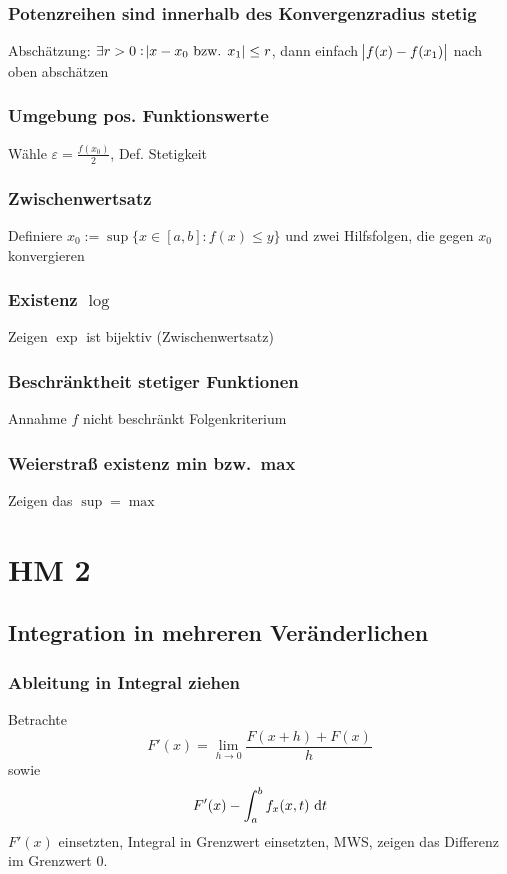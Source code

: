 \subsection{Potenzreihen sind innerhalb des Konvergenzradius stetig }
 Abschätzung: $\exists r>0 : \abs{x-x_0 \text{ bzw. }
 x_1} \leq r$, dann einfach $\abs{f(x)-f(x_1)}$ nach oben abschätzen
\subsection{Umgebung pos. Funktionswerte }
 Wähle $\varepsilon = \frac{f(x_0)}{2}$, Def. Stetigkeit
\subsection{Zwischenwertsatz }
 Definiere $x_0 := \sup \{x \in [a,b] : f(x) \leq y \}$ und zwei Hilfsfolgen, die gegen $x_0$ konvergieren
\subsection{Existenz $\log$ }
 Zeigen $\exp$ ist bijektiv (Zwischenwertsatz)
\subsection{Beschränktheit stetiger Funktionen}
 Annahme $f$ nicht beschränkt Folgenkriterium
\subsection{Weierstraß existenz min bzw.\ max }
 Zeigen das $\sup=\max$

 \chapter{HM 2}
 \section{Integration in mehreren Veränderlichen}
 \subsection{Ableitung in Integral ziehen}
 Betrachte
 \begin{equation*}
     F'(x) = \lim_{h \to 0} \frac{F(x + h) + F(x)}{h}
 \end{equation*}
 sowie
 \begin{equation*}
     F'(x) - \int_a^b f_x(x,t) \text{ d}t
 \end{equation*}
 $F'(x)$ einsetzten, Integral in Grenzwert einsetzten, MWS,
 zeigen das Differenz im Grenzwert $0$.

